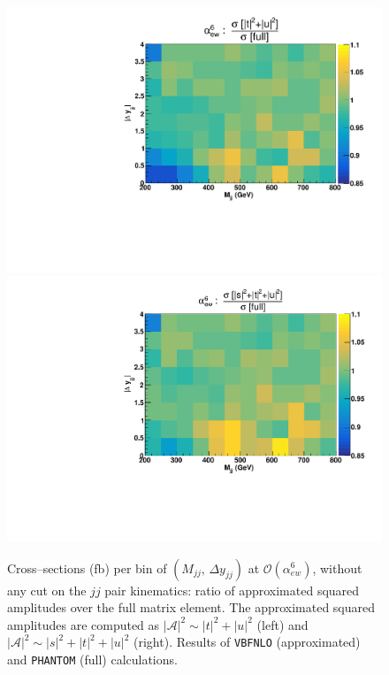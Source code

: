 \begin{figure}[hbt]
\centering
\includegraphics[scale=0.395]{figures/scanfigures/ratio_tu.pdf}
\includegraphics[scale=0.395]{figures/scanfigures/ratio_stu.pdf}
\caption{Cross--sections (fb) per bin of $(M_{jj},\,\Delta y_{jj})$ at $\mathcal{O}(\alpha_{ew}^6)$, without any cut on the $jj$ pair kinematics: ratio of approximated squared amplitudes over the full matrix element. The approximated squared amplitudes are computed as $|\mathcal{A}|^2 \sim |t|^2 + |u|^2$ (left) and $|\mathcal{A}|^2 \sim |s|^2 + |t|^2 + |u|^2$ (right). Results of \texttt{VBFNLO} (approximated) and \texttt{PHANTOM} (full) calculations.}\label{fig:ratio2d_LO}
\end{figure}

